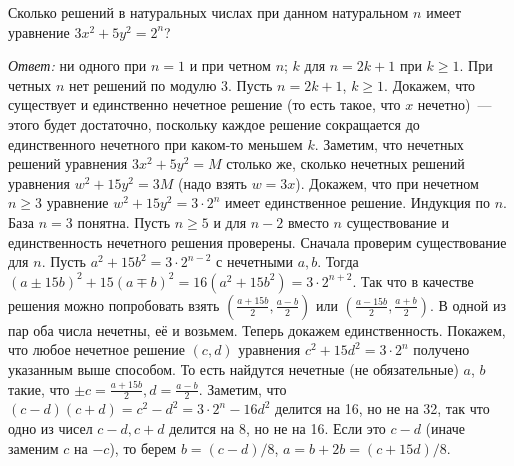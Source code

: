 \problem
{}
Сколько решений в натуральных числах при данном натуральном $n$ имеет уравнение
$3 x^2 + 5 y^2 = 2^n$?

\solution
\emph{Ответ:}
ни одного при $n = 1$ и при четном $n$;
$k$ для $n = 2 k + 1$ при $k \geq 1$.
%
При четных $n$ нет решений по модулю 3.
Пусть $n = 2 k + 1$, $k \geq 1$.
Докажем, что существует и единственно нечетное решение
(то есть такое, что $x$ нечетно)~--- этого будет достаточно, поскольку каждое
решение сокращается до единственного нечетного при каком-то меньшем $k$.
Заметим, что нечетных решений уравнения $3 x^2 + 5 y^2 = M$ столько же, сколько
нечетных решений уравнения $w^2 + 15 y^2 = 3 M$ (надо взять $w = 3 x$).
Докажем, что при нечетном $n \geq 3$ уравнение $w^2 + 15 y^2 = 3 \cdot 2^n$
имеет единственное решение.
Индукция по $n$.
База $n = 3$ понятна.
Пусть $n \geq 5$ и для $n - 2$ вместо $n$ существование и единственность
нечетного решения проверены.
Сначала проверим существование для $n$.
Пусть $a^2 + 15 b^2 = 3 \cdot 2^{n - 2}$ с нечетными $a, b$.
Тогда
\(
    (a \pm 15 b)^2 + 15(a \mp b)^2
=
    16(a^2 + 15 b^2)
=
    3 \cdot 2^{n + 2}
\).
Так что в качестве решения можно попробовать взять
$(\frac{a + 15 b}{2}, \frac{a - b}{2})$
или
$(\frac{a - 15 b}{2}, \frac{a + b}{2})$.
В одной из пар оба числа нечетны, её и возьмем.
Теперь докажем единственность.
Покажем, что любое нечетное решение $(c, d)$ уравнения
$c^2 + 15 d^2 = 3 \cdot 2^n$ получено указанным выше способом.
То есть найдутся нечетные (не обязательные) $a$, $b$ такие, что
$\pm c = \frac{a + 15 b}{2}, d = \frac{a - b}{2}$.
Заметим, что $(c - d)(c + d) = c^2 - d^2 = 3 \cdot 2^n - 16 d^2$ делится на 16,
но не на 32, так что одно из чисел $c - d, c + d$ делится на 8, но не на 16.
Если это $c - d$ (иначе заменим $c$ на $-c$), то берем $b = (c - d) / 8$,
$a = b + 2 b = (c + 15 d) / 8$.

\endproblem
